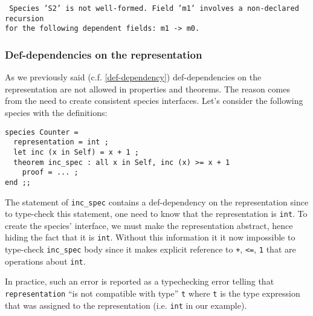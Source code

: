 \noindent
{\scriptsize
{\tt
Species 'S2' is not well-formed. Field
'm1' involves a non-declared recursion\\
for the following dependent fields: m1 -> m0.
}
}



\subsubsection{Def-dependencies on the representation}
\label{def-dep-on-representation}
As we previously said (c.f. \ref{def-dependency}) def-dependencies on
the representation are not allowed in properties and theorems. The reason
comes from the need to create consistent species interfaces. Let's
consider the following species with the definitions:
{\scriptsize
\begin{lstlisting}
species Counter =
  representation = int ;
  let inc (x in Self) = x + 1 ;
  theorem inc_spec : all x in Self, inc (x) >= x + 1
    proof = ... ;
end ;;
\end{lstlisting}
}

The statement of {\tt inc\_spec} contains a def-dependency on the
representation since to type-check this statement, one need to know
that the representation is  {\tt int}. To create the species'
interface, we must make the representation abstract, hence hiding the
fact that it is {\tt int}. Without this information it it now
impossible to type-check  {\tt inc\_spec}  body since it
makes explicit reference to {\tt +}, {\tt <=}, {\tt 1} that are
operations about {\tt int}.

In practice, such an error is reported as a typechecking error telling
that {\tt representation} ``is not compatible with type'' {\tt t}
where {\tt t} is the type expression that was assigned to the
representation (i.e. {\tt int} in our example).
